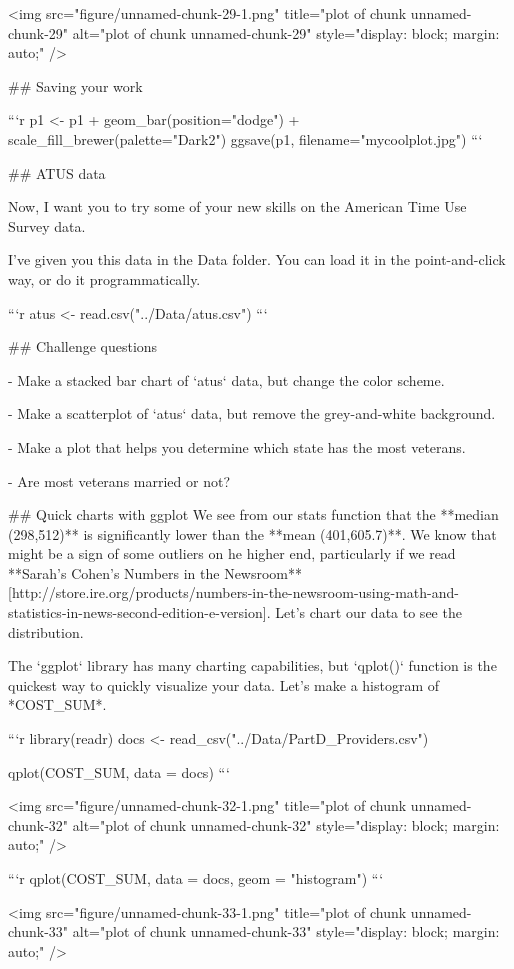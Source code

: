 <img src="figure/unnamed-chunk-29-1.png" title="plot of chunk unnamed-chunk-29" alt="plot of chunk unnamed-chunk-29" style="display: block; margin: auto;" />

## Saving your work 


```r
p1 <- p1 + geom_bar(position="dodge") + scale_fill_brewer(palette="Dark2")
ggsave(p1, filename="mycoolplot.jpg")
```

## ATUS data

Now, I want you to try some of your new skills on the American Time Use Survey data. 

I've given you this data in the Data folder. You can load it in the point-and-click way, or do it programmatically. 


```r
atus <- read.csv("../Data/atus.csv")
```

## Challenge questions

- Make a stacked bar chart of `atus` data, but change the color scheme.

- Make a scatterplot of `atus` data, but remove the grey-and-white background.

- Make a plot that helps you determine which state has the most veterans. 

- Are most veterans married or not?



## Quick charts with ggplot
We see from our stats function that the **median (298,512)** is significantly lower than the **mean (401,605.7)**. We know that might be a sign of some outliers on he higher end, particularly if we read **Sarah's Cohen's Numbers in the Newsroom** [http://store.ire.org/products/numbers-in-the-newsroom-using-math-and-statistics-in-news-second-edition-e-version]. Let's chart our data to see the distribution.

The `ggplot` library has many charting capabilities, but `qplot()` function is the quickest way to quickly visualize your data. Let's make a histogram of *COST_SUM*.


```r
library(readr)
docs <- read_csv("../Data/PartD_Providers.csv")

qplot(COST_SUM, data = docs)
```

<img src="figure/unnamed-chunk-32-1.png" title="plot of chunk unnamed-chunk-32" alt="plot of chunk unnamed-chunk-32" style="display: block; margin: auto;" />




```r
qplot(COST_SUM, data = docs, geom = "histogram")
```

<img src="figure/unnamed-chunk-33-1.png" title="plot of chunk unnamed-chunk-33" alt="plot of chunk unnamed-chunk-33" style="display: block; margin: auto;" />

